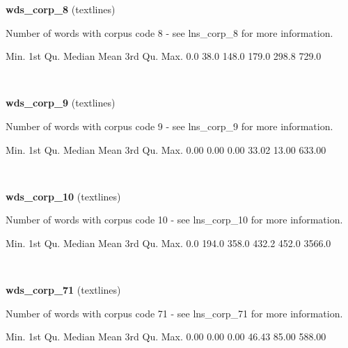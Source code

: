 \documentclass[]{article}
\newenvironment{Shaded}{\begin{snugshade}}{\end{snugshade}}
\newcommand{\FloatTok}[1]{\textcolor[rgb]{0.00,0.00,0.81}{{#1}}}
\newcommand{\NormalTok}[1]{{#1}}
\begin{document}
\textbf{wds\_corp\_8} (textlines)

Number of words with corpus code 8 - see lns\_corp\_8 for more
information.

\begin{Shaded}
\begin{Highlighting}[]
   \NormalTok{Min. 1st Qu.  Median    Mean 3rd Qu.    Max. }
    \FloatTok{0.0}    \FloatTok{38.0}   \FloatTok{148.0}   \FloatTok{179.0}   \FloatTok{298.8}   \FloatTok{729.0} 
\end{Highlighting}
\end{Shaded}

~

\vspace{1em}

\textbf{wds\_corp\_9} (textlines)

Number of words with corpus code 9 - see lns\_corp\_9 for more
information.

\begin{Shaded}
\begin{Highlighting}[]
   \NormalTok{Min. 1st Qu.  Median    Mean 3rd Qu.    Max. }
   \FloatTok{0.00}    \FloatTok{0.00}    \FloatTok{0.00}   \FloatTok{33.02}   \FloatTok{13.00}  \FloatTok{633.00} 
\end{Highlighting}
\end{Shaded}

~

\vspace{1em}

\textbf{wds\_corp\_10} (textlines)

Number of words with corpus code 10 - see lns\_corp\_10 for more
information.

\begin{Shaded}
\begin{Highlighting}[]
   \NormalTok{Min. 1st Qu.  Median    Mean 3rd Qu.    Max. }
    \FloatTok{0.0}   \FloatTok{194.0}   \FloatTok{358.0}   \FloatTok{432.2}   \FloatTok{452.0}  \FloatTok{3566.0} 
\end{Highlighting}
\end{Shaded}

~

\vspace{1em}

\textbf{wds\_corp\_71} (textlines)

Number of words with corpus code 71 - see lns\_corp\_71 for more
information.

\begin{Shaded}
\begin{Highlighting}[]
   \NormalTok{Min. 1st Qu.  Median    Mean 3rd Qu.    Max. }
   \FloatTok{0.00}    \FloatTok{0.00}    \FloatTok{0.00}   \FloatTok{46.43}   \FloatTok{85.00}  \FloatTok{588.00} 
\end{Highlighting}
\end{Shaded}
\end{document}
